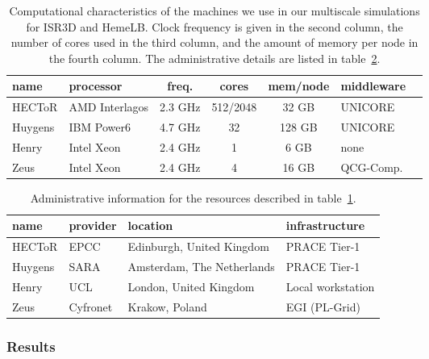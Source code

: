 \documentclass[a4,10pt]{article}
\begin{document}
\begin{table}[hbt]
\centering
\begin{tabular}{llcccll}
name & processor & freq. & cores & mem/node & middleware\\
\hline
HECToR  & AMD Interlagos & 2.3 GHz & 512/2048 & 32 GB  & UNICORE\\
Huygens & IBM Power6     & 4.7 GHz & 32 & 128 GB & UNICORE\\
Henry   & Intel Xeon     & 2.4 GHz & 1  & 6 GB   & none\\ 
Zeus    & Intel Xeon     & 2.4 GHz & 4  & 16 GB  & QCG-Comp.\\
\end{tabular}
\caption{Computational characteristics of the machines we use in our multiscale simulations for
ISR3D and HemeLB. Clock frequency is given in the second column, the number of cores used in the
third column, and the amount of memory per node in the fourth column. The administrative details 
are listed in table~\ref{table:resources}.}\label{table:machines}
\end{table}

\begin{table}[hbt]
\centering
\begin{tabular}{llll}
name & provider & location & infrastructure\\
\hline
HECToR  & EPCC & Edinburgh, United Kingdom  & PRACE Tier-1\\
Huygens & SARA & Amsterdam, The Netherlands & PRACE Tier-1\\
Henry   & UCL  & London, United Kingdom     & Local workstation\\
Zeus    & Cyfronet & Krakow, Poland         & EGI (PL-Grid)\\
\end{tabular}
\caption{Administrative information for the resources described in table~\ref{table:machines}.}\label{table:resources}
\end{table}

\subsubsection{Results}
\end{document}
